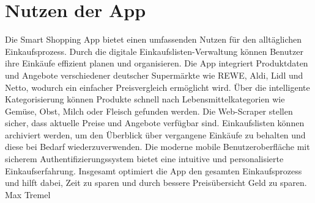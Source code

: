 \section{Nutzen der App}
Die Smart Shopping App bietet einen umfassenden Nutzen für den alltäglichen Einkaufsprozess. Durch die digitale Einkaufslisten-Verwaltung können Benutzer ihre Einkäufe effizient planen und organisieren. Die App integriert Produktdaten und Angebote verschiedener deutscher Supermärkte wie REWE, Aldi, Lidl und Netto, wodurch ein einfacher Preisvergleich ermöglicht wird. Über die intelligente Kategorisierung können Produkte schnell nach Lebensmittelkategorien wie Gemüse, Obst, Milch oder Fleisch gefunden werden. Die Web-Scraper stellen sicher, dass aktuelle Preise und Angebote verfügbar sind. Einkaufslisten können archiviert werden, um den Überblick über vergangene Einkäufe zu behalten und diese bei Bedarf wiederzuverwenden. Die moderne mobile Benutzeroberfläche mit sicherem Authentifizierungssystem bietet eine intuitive und personalisierte Einkaufserfahrung. Insgesamt optimiert die App den gesamten Einkaufsprozess und hilft dabei, Zeit zu sparen und durch bessere Preisübersicht Geld zu sparen.
Max Tremel 
